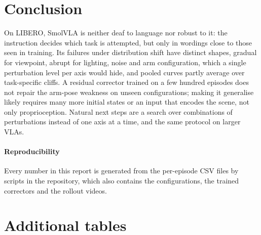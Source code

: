 \documentclass[10pt,twocolumn,letterpaper]{article}
\begin{document}
\section{Conclusion}
On LIBERO, SmolVLA is neither deaf to language nor robust to it: the instruction decides which task is
attempted, but only in wordings close to those seen in training. Its failures under distribution shift have
distinct shapes, gradual for viewpoint, abrupt for lighting, noise and arm configuration, which a single
perturbation level per axis would hide, and pooled curves partly average over task-specific cliffs. A
residual corrector trained on a few hundred episodes does not repair the arm-pose weakness on unseen
configurations; making it generalise likely requires many more initial states or an input that encodes the
scene, not only proprioception. Natural next steps are a search over combinations of perturbations instead
of one axis at a time, and the same protocol on larger VLAs.

\paragraph{Reproducibility} Every number in this report is generated from the per-episode CSV files by
scripts in the repository, which also contains the configurations, the trained correctors and the
rollout videos.

{\small

\setlength{\bibsep}{1.5pt}

}

\appendix
\section{Additional tables}
\begin{table}[h]
\centering
\caption{\textbf{Unperturbed successes per task} (out of 10).}
\label{tab:pertask}
\scriptsize
\setlength{\tabcolsep}{3pt}

\end{table}

\begin{table}[h]
\centering
\caption{\textbf{PPO configuration}, read from the saved checkpoints.}
\label{tab:ppo}
\scriptsize

\end{table}

\begin{table}[h]
\centering
\caption{\textbf{Compute.} Wall-clock time on an Apple M1 laptop (8\,GB), one process at a time.}
\label{tab:compute}
\scriptsize

\end{table}

\begin{table}[t]
\centering
\caption{\textbf{Paraphrases} used in \cref{fig:variants}, with successes out of 5 (original wording:
episodes 0--4 of the baseline).}
\label{tab:paraphrases}
\scriptsize

\end{table}
\end{document}
